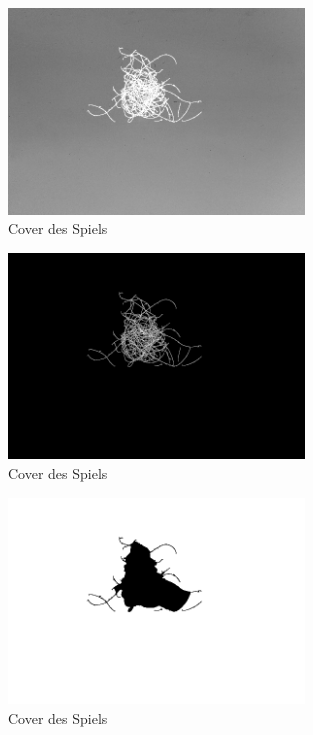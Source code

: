 \documentclass[german,a4paper, 12pt]{scrartcl}
\begin{document}
\begin{figure}
	\centering
	\includegraphics[width=0.7\textwidth]{figBina/07missed hair.png}
	\caption[]{Cover des Spiels}
	\label{img:Bina01}
\end{figure}
\begin{figure}
	\centering
	\includegraphics[width=0.7\textwidth]{figBina/08input intensity.png}
	\caption[]{Cover des Spiels}
	\label{img:Bina01}
\end{figure}
\begin{figure}
	\centering
	\includegraphics[width=0.7\textwidth]{figBina/08outer section.png}
	\caption[]{Cover des Spiels}
	\label{img:Bina01}
\end{figure}
\end{document}
